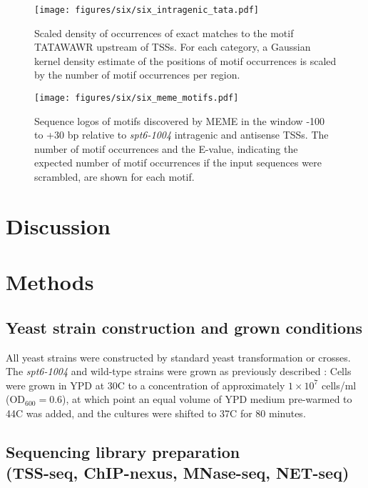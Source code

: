 \begin{SCfigure}[50][h]
    \centering
    \texttt{[image: figures/six/six\_intragenic\_tata.pdf]}
    \caption[Kernel density estimate of matches to a consensus TATA-box motif upstream of genic and \textit{spt6-1004}-induced intragenic TSSs.]{Scaled density of occurrences of exact matches to the motif TATAWAWR upstream of TSSs. For each category, a Gaussian kernel density estimate of the positions of motif occurrences is scaled by the number of motif occurrences per region.}
    \label{fig:six_intragenic_tata}
\end{SCfigure}

\begin{figure}[h]
    \centering
    \texttt{[image: figures/six/six\_meme\_motifs.pdf]}
    \caption[Sequence logos of motifs discovered by MEME upstream of \textit{spt6-1004}-induced intragenic and antisense TSSs.]{Sequence logos of motifs discovered by MEME \citep{bailey2015} in the window -100 to +30 bp relative to \textit{spt6-1004} intragenic and antisense TSSs. The number of motif occurrences and the E-value, indicating the expected number of motif occurrences if the input sequences were scrambled, are shown for each motif.}
    \label{fig:six_meme_motifs}
\end{figure}

\section{Discussion}

\clearpage
\section{Methods}

\subsection{Yeast strain construction and grown conditions}

All yeast strains were constructed by standard yeast transformation or crosses.
The \textit{spt6-1004} and wild-type strains were grown as previously described \citep{cheung2008}: Cells were grown in YPD at 30\textdegree C to a concentration of approximately $1 \times 10^7$ cells/ml (OD$_{600} = 0.6$), at which point an equal volume of YPD medium pre-warmed to 44\textdegree C was added, and the cultures were shifted to 37\textdegree C for 80 minutes.

\subsection{Sequencing library preparation\\(TSS-seq, ChIP-nexus, MNase-seq, NET-seq)}

